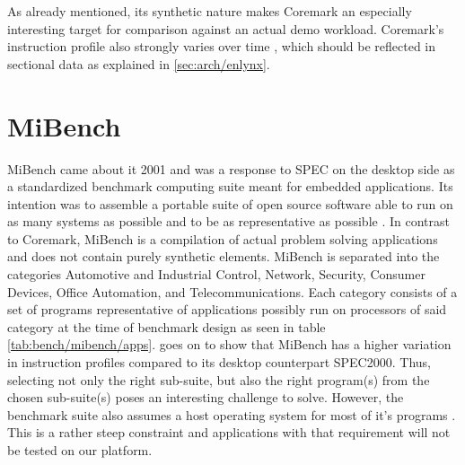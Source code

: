 \documentclass[../bachelor_paper.tex]{subfiles}
\begin{document}
As already mentioned, its synthetic nature makes Coremark an especially interesting target for comparison against an actual demo workload. Coremark's instruction profile also strongly varies over time \cite{gal-onExploringCoremarkBenchmark2012}, which should be reflected in sectional data as explained in \ref{sec:arch/enlynx}.

\section{MiBench}
MiBench came about it 2001 and was a response to \acs{SPEC} on the desktop side as a standardized benchmark computing suite meant for embedded applications. Its intention was to assemble a portable suite of open source software able to run on as many systems as possible and to be as representative as possible \cite{guthausMiBenchFreeCommercially2001}. In contrast to Coremark, MiBench is a compilation of actual problem solving applications and does not contain purely synthetic elements. MiBench is separated into the categories Automotive and
Industrial Control, Network, Security, Consumer Devices, Office Automation, and Telecommunications. Each category consists of a set of programs representative of applications possibly run on processors of said category at the time of benchmark design as seen in table \ref{tab:bench/mibench/apps}. \cite{guthausMiBenchFreeCommercially2001} goes on to show that MiBench has a higher variation in instruction profiles compared to its desktop counterpart \acs{SPEC}2000. Thus, selecting not only the right sub-suite, but also the right program(s) from the chosen sub-suite(s) poses an interesting challenge to solve. However, the benchmark suite also assumes a host operating system for most of it's programs \cite{pallisterBEEBSOpenBenchmarks2013}. This is a rather steep constraint and applications with that requirement will not be tested on our platform. 
\end{document}
